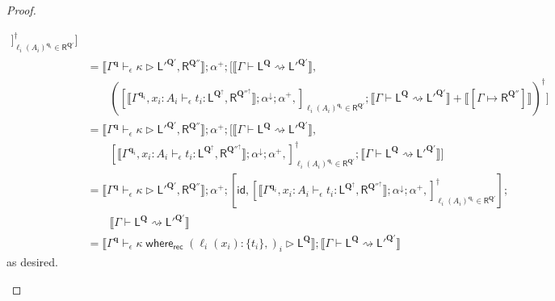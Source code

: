 \documentclass[acmsmall,screen,anonymous,review]{acmart}
\newcommand{\mb}[1]{\ensuremath{\mathbf{#1}}}
\newcommand{\ms}[1]{\ensuremath{\mathsf{#1}}}
\newcommand{\lto}{:}
\newcommand{\cwhere}[2]{#1\;\ms{where}_{\ms{rec}}\;#2}
\newcommand{\wbranch}[3]{#1(#2) \lto \{#3\}}
\newcommand{\qsp}[4]{#1 \vdash #2 = #3 + #4}
\newcommand{\lwk}[3]{#1 \vdash #2 \rightsquigarrow #3}
\newcommand{\hasty}[4]{#1 \vdash_{#2} #3: {#4}}
\newcommand{\haslb}[4]{#1 \vdash_{#2} #3 \rhd #4}
\newcommand{\tossa}[2]{\ms{SSA}_{#1}(#2)}
\newcommand{\ltoty}[2]{[#1 \mapsto #2]}
\newcommand{\dnt}[1]{\llbracket{#1}\rrbracket}
\newcommand{\zeroqv}[1]{#1^\uparrow}
\begin{document}
\begin{proof}
\begin{itemize}
\begin{align*}
      ]_{\ell_i(A_i)^{\mb{q}_i} \in \ms{R}^{\mb{Q}'}}^\dagger
    ] \\
    & = \dnt{\haslb{\Gamma^{\mb{q}}}{\epsilon}{\kappa}{\ms{L}'^{\mb{Q}'}, \ms{R}^{\mb{Q}''}}}
      ; \alpha^+
      ; [
      \dnt{\lwk{\Gamma}{\ms{L}^{\mb{Q}}}{\ms{L}'^{\mb{Q}'}}} , \\ & \qquad
      ([
        \dnt{\hasty{\Gamma^{\mb{q}_i}, x_i : A_i}{\epsilon}{t_i}
          {\ms{L}^{\zeroqv{\mb{Q}}}, \ms{R}^{\zeroqv{\mb{Q}''}}}}
        ; \alpha^\downarrow ; \alpha^+,
      ]_{\ell_i(A_i)^{\mb{q}_i} \in \ms{R}^{\mb{Q}'}} 
        ; \dnt{\lwk{\Gamma}{\ms{L}^{\mb{Q}}}{\ms{L}'^{\mb{Q}'}}} 
        + \dnt{\ltoty{\Gamma}{\ms{R}^{\mb{Q}''}}})^\dagger
    ] \\
    & = \dnt{\haslb{\Gamma^{\mb{q}}}{\epsilon}{\kappa}{\ms{L}'^{\mb{Q}'}, \ms{R}^{\mb{Q}''}}}
      ; \alpha^+
      ; [
      \dnt{\lwk{\Gamma}{\ms{L}^{\mb{Q}}}{\ms{L}'^{\mb{Q}'}}} , \\ & \qquad
      [
        \dnt{\hasty{\Gamma^{\mb{q}_i}, x_i : A_i}{\epsilon}{t_i}
          {\ms{L}^{\zeroqv{\mb{Q}}}, \ms{R}^{\zeroqv{\mb{Q}''}}}}
        ; \alpha^\downarrow ; \alpha^+,
      ]_{\ell_i(A_i)^{\mb{q}_i} \in \ms{R}^{\mb{Q}'}}^\dagger
      ; \dnt{\lwk{\Gamma}{\ms{L}^{\mb{Q}}}{\ms{L}'^{\mb{Q}'}}}
    ] \\
    & = \dnt{\haslb{\Gamma^{\mb{q}}}{\epsilon}{\kappa}{\ms{L}'^{\mb{Q}'}, \ms{R}^{\mb{Q}''}}}
      ; \alpha^+
      ; [
      \ms{id} ,
      [
        \dnt{\hasty{\Gamma^{\mb{q}_i}, x_i : A_i}{\epsilon}{t_i}
          {\ms{L}^{\zeroqv{\mb{Q}}}, \ms{R}^{\zeroqv{\mb{Q}''}}}}
        ; \alpha^\downarrow ; \alpha^+,
      ]_{\ell_i(A_i)^{\mb{q}_i} \in \ms{R}^{\mb{Q}'}}^\dagger
    ] ; \\ & \qquad \dnt{\lwk{\Gamma}{\ms{L}^{\mb{Q}}}{\ms{L}'^{\mb{Q}'}}} \\
    &= \dnt{\haslb{\Gamma^{\mb{q}}}{\epsilon}{\cwhere{\kappa}{(\wbranch{\ell_i}{x_i}{t_i},)_i}}
      {\ms{L}^{\mb{Q}}}} ; \dnt{\lwk{\Gamma}{\ms{L}^{\mb{Q}}}{\ms{L}'^{\mb{Q}'}}}
    \end{align*}
    as desired.
  \end{itemize}
\end{proof}
\end{document}
